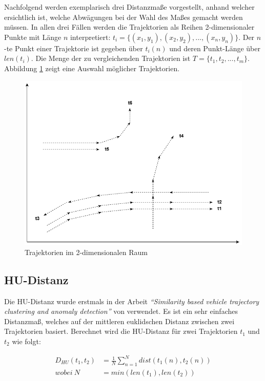 
Nachfolgend werden exemplarisch drei Distanzmaße vorgestellt, anhand welcher ersichtlich ist, welche Abwägungen
bei der Wahl des Maßes gemacht werden müssen.
In allen drei Fällen werden die Trajektorien als Reihen 2-dimensionaler Punkte mit Länge $n$ interpretiert: $t_i = \{(x_1, y_1), (x_2, y_2), ..., (x_n, y_n)\}$.
Der $n$-te Punkt einer Trajektorie ist gegeben über $t_i(n)$ und deren Punkt-Länge über $len(t_i)$.
Die Menge der zu vergleichenden Trajektorien ist $T = \{t_1, t_2, ..., t_m\}$.
Abbildung \ref{fig:grund_trajectories} zeigt eine Auswahl möglicher Trajektorien.

\begin{figure}[H]
\centering
\includegraphics[width=0.6\linewidth]{resources/img/grundlagen/trajectories}
\caption{Trajektorien im 2-dimensionalen Raum}
\label{fig:grund_trajectories}
\end{figure}

\subsection{HU-Distanz}
\label{sec:hu_distance}

Die HU-Distanz wurde erstmals in der Arbeit \textit{``Similarity based vehicle trajectory clustering and anomaly detection''}
von \cite[]{Hu2005} verwendet. Es ist ein sehr einfaches Distanzmaß, welches auf der mittleren euklidschen Distanz
zwischen zwei Trajektorien basiert. Berechnet wird die HU-Distanz für zwei Trajektorien $t_1$ und $t_2$ wie folgt:

\begin{ceqn}
\begin{align}
\label{eq_hu_distance1}
    D_{HU}(t_1, t_2) &= \frac{1}{N} \sum_{n = 1}^N dist(t_1(n), t_2(n)) \\
\label{eq_hu_distance2}
    wobei\ N &= min(len(t_1), len(t_2))
\end{align}
\end{ceqn}

